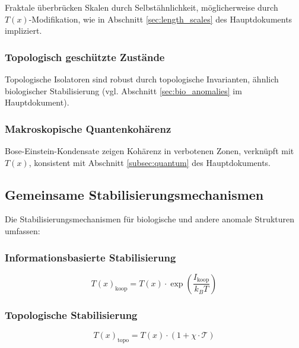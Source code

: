 \documentclass[12pt,a4paper]{article}
\newcommand{\Tfield}{T(x)}
\begin{document}
	Fraktale überbrücken Skalen durch Selbstähnlichkeit, möglicherweise durch \(\Tfield\)-Modifikation, wie in Abschnitt \ref{sec:length_scales} des Hauptdokuments impliziert.
	
	\subsubsection{Topologisch geschützte Zustände}
	\label{subsubsec:topologische_zustaende}
	
	Topologische Isolatoren sind robust durch topologische Invarianten, ähnlich biologischer Stabilisierung (vgl. Abschnitt \ref{sec:bio_anomalies} im Hauptdokument).
	
	\subsubsection{Makroskopische Quantenkohärenz}
	\label{subsubsec:quantenkohaerenz}
	
	Bose-Einstein-Kondensate zeigen Kohärenz in verbotenen Zonen, verknüpft mit \(\Tfield\), konsistent mit Abschnitt \ref{subsec:quantum} des Hauptdokuments.
	
	\subsection{Gemeinsame Stabilisierungsmechanismen}
	\label{subsec:stabilisierungsmechanismen}
	
	Die Stabilisierungsmechanismen für biologische und andere anomale Strukturen umfassen:
	
	\subsubsection{Informationsbasierte Stabilisierung}
	\label{subsubsec:info_stabilisierung}
	
	\begin{equation}
		\Tfield_{\text{koop}} = \Tfield \cdot \exp\left(\frac{I_{\text{koop}}}{k_B T}\right)
	\end{equation}
	
	\subsubsection{Topologische Stabilisierung}
	\label{subsubsec:topo_stabilisierung}
	
	\begin{equation}
		\Tfield_{\text{topo}} = \Tfield \cdot (1 + \chi \cdot \mathcal{T})
	\end{equation}
	
\end{document}
